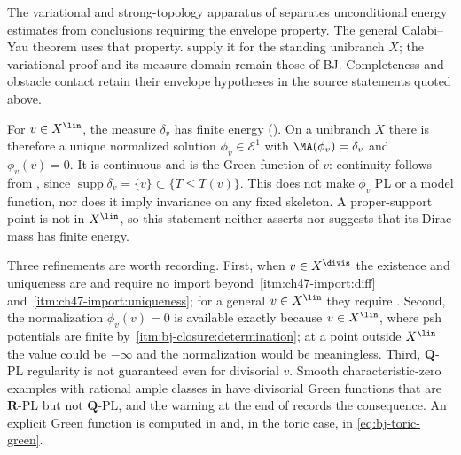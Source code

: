 \begin{remark}
\label{rem:ch47-what-changed}
The variational and strong-topology apparatus of \cite[\S\S8--12]{BJ22}
separates unconditional energy estimates from conclusions requiring the
envelope property. The general Calabi--Yau theorem uses that property.
supply it for the standing unibranch $X$; the variational proof and its
measure domain remain those of BJ. Completeness and obstacle contact retain
their envelope hypotheses in the source statements quoted above.
\end{remark}

\begin{example}
\label{ex:ch47-dirac-green}
For $v\in X^{\lin}$, the measure $\delta_v$ has finite energy
().  On a unibranch $X$ there is
therefore a unique normalized solution $\phi_v\in\mathcal E^1$ with
$\MA(\phi_v)=\delta_v$ and $\phi_v(v)=0$.  It is continuous and is the
Green function of $v$: continuity follows from
\cite[Theorem~12.12 and Proposition~12.14(i)]{BJ22}, since
$\operatorname{supp}\delta_v=\{v\}\subset\{T\leq T(v)\}$.
This does not make $\phi_v$ PL or a model function, nor does it imply
invariance on any fixed skeleton.  A proper-support point is not in
$X^{\lin}$, so this statement neither asserts nor suggests that its
Dirac mass has finite energy.

Three refinements are worth recording.  First, when $v\in X^{\divis}$ the
existence and uniqueness are  and require
no import beyond \,\cref{itm:ch47-import:diff}
and~\cref{itm:ch47-import:uniqueness}; for a general $v\in X^{\lin}$ they
require .  Second, the normalization
$\phi_v(v)=0$ is available exactly because $v\in X^{\lin}$, where
psh potentials are finite by
\,\cref{itm:bj-closure:determination}; at a point outside $X^{\lin}$ the
value could be $-\infty$ and the normalization would be meaningless.
Third, $\mathbf Q$-PL regularity is not guaranteed even for
divisorial $v$. Smooth characteristic-zero examples with rational
ample classes in \cite[Theorem~60 and Examples~63, 65]{BJGreen24}
have divisorial Green functions that are $\mathbf R$-PL but not
$\mathbf Q$-PL,
and the warning at the end of  records the
consequence.  An explicit Green function is computed in
 and, in the toric case, in
\eqref{eq:bj-toric-green}.
\end{example}

